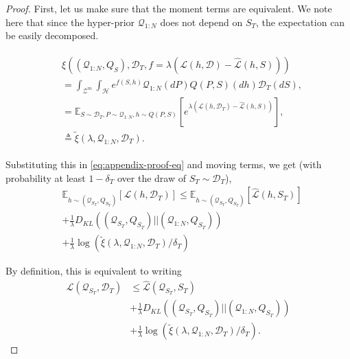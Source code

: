 \documentclass{article} %
\theoremstyle{definition}
\newcommand{\Expect}[2]{\mathbb{E}_{#1}\left [#2 \right ]}
\begin{document}
\begin{proof}
	First, let us make sure that the moment terms are equivalent. We note here that since the hyper-prior $\mathcal{Q}_{1:N}$ does not depend on $S_T$, the expectation can be easily decomposed.
	
	\begin{align*}
	\begin{split}
		&\xi\left ((\mathcal{Q}_{1:N}, Q_S), \mathcal{D}_T, f=\lambda(\mathcal{L}(h,\mathcal{D})-\hat{\mathcal{L}}(h,S))\right )\\
		&=\int_{\mathcal{Z}^m}\int_{\mathcal{H}}e^{f(S,h)}\mathcal{Q}_{1:N}(dP)Q(P,S)(dh)\mathcal{D}_T(dS) ,\\
		&=\Expect{S\sim \mathcal{D}_T, P\sim \mathcal{Q}_{1:N}, h\sim Q(P,S)}{e^{\lambda\left (\mathcal{L}(h, \mathcal{D}_T)-\hat{\mathcal{L}}(h, S)\right )}} ,\\
		&\triangleq \tilde{\xi}(\lambda,\mathcal{Q}_{1:N},\mathcal{D}_T) .
	\end{split}
	\end{align*}
	
	Substituting this in \eqref{eq:appendix-proof-eq} and moving terms, we get (with probability at least $1-\delta_T$ over the draw of $S_T\sim \mathcal{D}_T$),
	\begin{equation} 
	\begin{split}
	&\Expect{h\sim (\mathcal{Q}_{S_T}, Q_{S_T})}{\mathcal{L}(h,\mathcal{D}_T)} \leq \Expect{h\sim (\mathcal{Q}_{S_T}, Q_{S_T})}{\hat{\mathcal{L}}(h,S_T)}\\
	&+\frac{1}{\lambda} D_{KL}((\mathcal{Q}_{S_T}, Q_{S_T})||(\mathcal{Q}_{1:N}, Q_{S_T}))\\
	&+\frac{1}{\lambda}\log\left (\tilde{\xi}(\lambda,\mathcal{Q}_{1:N},\mathcal{D}_T)/\delta_T\right )
	\end{split}
	\end{equation}
	
	By definition, this is equivalent to writing
%	
	\begin{equation} \label{eq:appendix-proof-eq-2}
	\begin{split}
	\mathcal{L}(\mathcal{Q}_{S_T},\mathcal{D}_T) &\leq \hat{\mathcal{L}}(\mathcal{Q}_{S_T},S_T)\\ &+\frac{1}{\lambda} D_{KL}((\mathcal{Q}_{S_T}, Q_{S_T})||(\mathcal{Q}_{1:N}, Q_{S_T})) \\
	&+\frac{1}{\lambda}\log\left (\tilde{\xi}(\lambda,\mathcal{Q}_{1:N},\mathcal{D}_T)/\delta_T\right ) .
	\end{split}
	\end{equation}
	

\end{proof}
\end{document}
